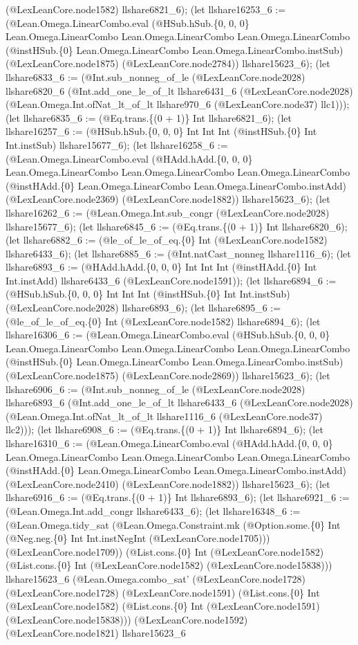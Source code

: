 \documentclass[11pt]{article}
\begin{document}
(@LexLeanCore.node1582) llshare6821\_6); (let llshare16253\_6 := (@Lean.Omega.LinearCombo.eval (@HSub.hSub.\{0, 0, 0\} Lean.Omega.LinearCombo Lean.Omega.LinearCombo Lean.Omega.LinearCombo (@instHSub.\{0\} Lean.Omega.LinearCombo Lean.Omega.LinearCombo.instSub) (@LexLeanCore.node1875) (@LexLeanCore.node2784)) llshare15623\_6); (let llshare6833\_6 := (@Int.sub\_nonneg\_of\_le (@LexLeanCore.node2028) llshare6820\_6 (@Int.add\_one\_le\_of\_lt llshare6431\_6 (@LexLeanCore.node2028) (@Lean.Omega.Int.ofNat\_lt\_of\_lt llshare970\_6 (@LexLeanCore.node37) llc1))); (let llshare6835\_6 := (@Eq.trans.\{(0 + 1)\} Int llshare6821\_6); (let llshare16257\_6 := (@HSub.hSub.\{0, 0, 0\} Int Int Int (@instHSub.\{0\} Int Int.instSub) llshare15677\_6); (let llshare16258\_6 := (@Lean.Omega.LinearCombo.eval (@HAdd.hAdd.\{0, 0, 0\} Lean.Omega.LinearCombo Lean.Omega.LinearCombo Lean.Omega.LinearCombo (@instHAdd.\{0\} Lean.Omega.LinearCombo Lean.Omega.LinearCombo.instAdd) (@LexLeanCore.node2369) (@LexLeanCore.node1882)) llshare15623\_6); (let llshare16262\_6 := (@Lean.Omega.Int.sub\_congr (@LexLeanCore.node2028) llshare15677\_6); (let llshare6845\_6 := (@Eq.trans.\{(0 + 1)\} Int llshare6820\_6); (let llshare6882\_6 := (@le\_of\_le\_of\_eq.\{0\} Int (@LexLeanCore.node1582) llshare6433\_6); (let llshare6885\_6 := (@Int.natCast\_nonneg llshare1116\_6); (let llshare6893\_6 := (@HAdd.hAdd.\{0, 0, 0\} Int Int Int (@instHAdd.\{0\} Int Int.instAdd) llshare6433\_6 (@LexLeanCore.node1591)); (let llshare6894\_6 := (@HSub.hSub.\{0, 0, 0\} Int Int Int (@instHSub.\{0\} Int Int.instSub) (@LexLeanCore.node2028) llshare6893\_6); (let llshare6895\_6 := (@le\_of\_le\_of\_eq.\{0\} Int (@LexLeanCore.node1582) llshare6894\_6); (let llshare16306\_6 := (@Lean.Omega.LinearCombo.eval (@HSub.hSub.\{0, 0, 0\} Lean.Omega.LinearCombo Lean.Omega.LinearCombo Lean.Omega.LinearCombo (@instHSub.\{0\} Lean.Omega.LinearCombo Lean.Omega.LinearCombo.instSub) (@LexLeanCore.node1875) (@LexLeanCore.node2869)) llshare15623\_6); (let llshare6906\_6 := (@Int.sub\_nonneg\_of\_le (@LexLeanCore.node2028) llshare6893\_6 (@Int.add\_one\_le\_of\_lt llshare6433\_6 (@LexLeanCore.node2028) (@Lean.Omega.Int.ofNat\_lt\_of\_lt llshare1116\_6 (@LexLeanCore.node37) llc2))); (let llshare6908\_6 := (@Eq.trans.\{(0 + 1)\} Int llshare6894\_6); (let llshare16310\_6 := (@Lean.Omega.LinearCombo.eval (@HAdd.hAdd.\{0, 0, 0\} Lean.Omega.LinearCombo Lean.Omega.LinearCombo Lean.Omega.LinearCombo (@instHAdd.\{0\} Lean.Omega.LinearCombo Lean.Omega.LinearCombo.instAdd) (@LexLeanCore.node2410) (@LexLeanCore.node1882)) llshare15623\_6); (let llshare6916\_6 := (@Eq.trans.\{(0 + 1)\} Int llshare6893\_6); (let llshare6921\_6 := (@Lean.Omega.Int.add\_congr llshare6433\_6); (let llshare16348\_6 := (@Lean.Omega.tidy\_sat (@Lean.Omega.Constraint.mk (@Option.some.\{0\} Int (@Neg.neg.\{0\} Int Int.instNegInt (@LexLeanCore.node1705))) (@LexLeanCore.node1709)) (@List.cons.\{0\} Int (@LexLeanCore.node1582) (@List.cons.\{0\} Int (@LexLeanCore.node1582) (@LexLeanCore.node15838))) llshare15623\_6 (@Lean.Omega.combo\_sat' (@LexLeanCore.node1728) (@LexLeanCore.node1728) (@LexLeanCore.node1591) (@List.cons.\{0\} Int (@LexLeanCore.node1582) (@List.cons.\{0\} Int (@LexLeanCore.node1591) (@LexLeanCore.node15838))) (@LexLeanCore.node1592) (@LexLeanCore.node1821) llshare15623\_6 
\end{document}
